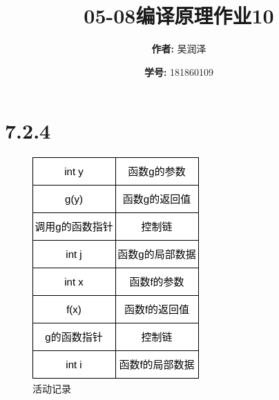 \documentclass[11pt]{article}
\title{05-08编译原理作业10}
\author{
			\textbf{作者:} {吴润泽}
			\and {\textbf{学号:} 181860109}
		}
\begin{document}
\maketitle
\section*{7.2.4}
\begin{figure}[H]
	\centering
	\includegraphics[scale=0.9]{7.2.4.png}
	\caption{活动记录}
\end{figure}
\end{document}
